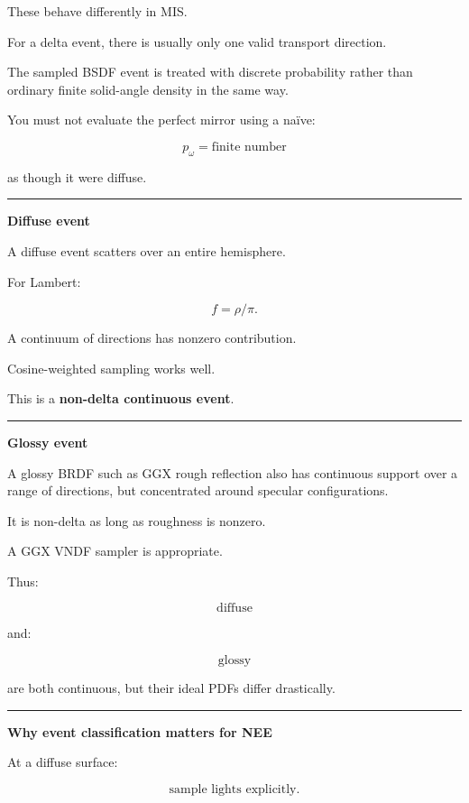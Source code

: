 These behave differently in MIS.

For a delta event, there is usually only one valid transport direction.

The sampled BSDF event is treated with discrete probability rather than ordinary finite solid-angle density in the same way.

You must not evaluate the perfect mirror using a naïve:

\[
p_\omega=\text{finite number}
\]

as though it were diffuse.

\begin{center}\rule{0.5\linewidth}{0.5pt}\end{center}

\textbf{Diffuse event}

A diffuse event scatters over an entire hemisphere.

For Lambert:

\[
f=\rho/\pi.
\]

A continuum of directions has nonzero contribution.

Cosine-weighted sampling works well.

This is a \textbf{non-delta continuous event}.

\begin{center}\rule{0.5\linewidth}{0.5pt}\end{center}

\textbf{Glossy event}

A glossy BRDF such as GGX rough reflection also has continuous support over a range of directions, but concentrated around specular configurations.

It is non-delta as long as roughness is nonzero.

A GGX VNDF sampler is appropriate.

Thus:

\[
\text{diffuse}
\]

and:

\[
\text{glossy}
\]

are both continuous, but their ideal PDFs differ drastically.

\begin{center}\rule{0.5\linewidth}{0.5pt}\end{center}

\textbf{Why event classification matters for NEE}

At a diffuse surface:

\[
\text{sample lights explicitly}.
\]

